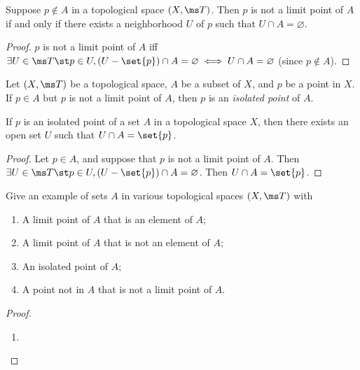 \begin{problem}[3.9]
  Suppose $p \not \in A$ in a topological space $(X, \ms T)$. Then $p$ is not a
  limit point of $A$ if and only if there exists a neighborhood $U$ of $p$ such
  that $U \cap A =\varnothing$.
\end{problem}
\begin{proof}
  $p$ is not a limit point of $A$ iff $\exists U \in \ms T \st p \in U, (U -
  \set{p}) \cap A = \varnothing \iff U \cap A = \varnothing$ (since $p \not \in
  A$).
\end{proof}
\begin{definition}
  Let $(X, \ms T)$ be a topological space, $A$ be a subset of $X$, and $p$ be a
  point in $X$. If $p \in A$ but $p$ is not a limit point of $A$, then $p$ is an
  \emph{isolated point} of $A$.
\end{definition}
\begin{problem}[3.10]
  If $p$ is an isolated point of a set $A$ in a topological space $X$, then
  there exists an open set $U$ such that $U \cap A = \set{p}$.
\end{problem}
\begin{proof}
  Let $p \in A$, and suppose that $p$ is not a limit point of $A$. Then $\exists
  U \in \ms T \st p \in U, (U - \set{p}) \cap A = \varnothing$. Then $U \cap A =
  \set{p}$.
\end{proof}
\begin{problem}[3.11]
  Give an example of sets $A$ in various topological spaces $(X,\ms T)$ with
  \begin{enumerate}[label=\arabic*.]
    \item A limit point of $A$ that is an element of $A$;
    \item A limit point of $A$ that is not an element of $A$;
    \item An isolated point of $A$;
    \item A point not in $A$ that is not a limit point of $A$.
  \end{enumerate}
\end{problem}
\begin{proof}~
  \begin{enumerate}[label=\arabic*.]
    \item
  \end{enumerate}
\end{proof}

